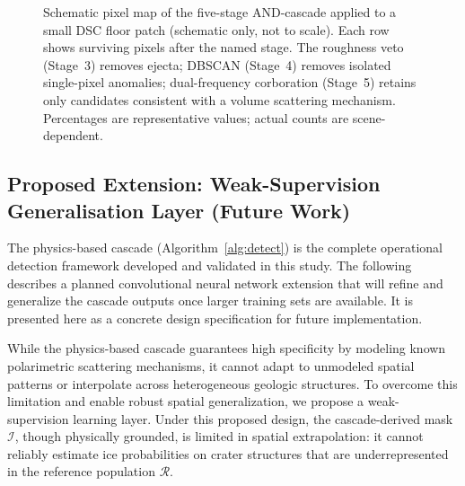 \documentclass[10pt,conference]{IEEEtran}
\begin{document}
\begin{figure}[htbp]
\caption{Schematic pixel map of the five-stage AND-cascade applied to a
small DSC floor patch (schematic only, not to scale). Each row shows surviving
pixels after the named stage. The roughness veto (Stage~3) removes ejecta;
DBSCAN (Stage~4) removes isolated single-pixel anomalies; dual-frequency
corboration (Stage~5) retains only candidates consistent with a volume
scattering mechanism. Percentages are representative values; actual counts are
scene-dependent.}
\label{fig:stages}
\end{figure}

\subsection{Proposed Extension: Weak-Supervision Generalisation Layer (Future Work)}
\label{sec:method:unet}

The physics-based cascade (Algorithm~\ref{alg:detect}) is the complete operational detection framework developed and validated in this study. The following describes a planned convolutional neural network extension that will refine and generalize the cascade outputs once larger training sets are available. It is presented here as a concrete design specification for future implementation.

While the physics-based cascade guarantees high specificity by modeling known polarimetric scattering mechanisms, it cannot adapt to unmodeled spatial patterns or interpolate across heterogeneous geologic structures. To overcome this limitation and enable robust spatial generalization, we propose a weak-supervision learning layer. Under this proposed design, the cascade-derived mask $\mathcal{I}$, though physically grounded, is limited in spatial extrapolation: it cannot reliably estimate ice probabilities on crater structures that are underrepresented in the reference population $\mathcal{R}$.
\end{document}
